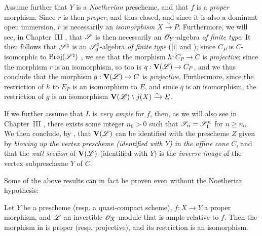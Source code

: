 \begin{remark}[8.8.3]
\label{II.8.8.3}
Assume further that $Y$ is a \emph{Noetherian} prescheme, and that $f$ is a \emph{proper} morphism.
Since $r$ is then \emph{proper}, and thus closed, and since it is also a dominant open immersion, $r$ is necessarily an \emph{isomorphism} $X\xrightarrow{\sim}P$.
Furthermore, we will see, in Chapter~III , that $\mathscr{S}$ is then necessarily an $\mathscr{O}_Y$-algebra \emph{of finite type}.
It then follows that $\mathscr{S}^\natural$ is an $\mathscr{S}_0^\natural$-algebra \emph{of finite type} ([i] and );
since $C_P$ is $C$-isomorphic to $\operatorname{Proj}(\mathscr{S}^\natural)$ , we see that the morphism $h:C_P\to C$ is \emph{projective};
since the morphism $r$ is an isomorphism, so too is $q:\bb{V}(\sh{L})\to C_P$, and we thus conclude that the morphism $g:\bb{V}(\sh{L})\to C$ is \emph{projective}.
Furthermore, since the restriction of $h$ to $E_P$ is an isomorphism to $E$, and since $q$ is an isomorphism, the restriction  of $g$ is an isomorphism $\mathbf{V}(\mathscr{L})\setminus j(X)\xrightarrow{\sim}E$.

If we further assume that $L$ is \emph{very ample} for $f$, then, as we will also see in Chapter~III , there exists some integer $n_0>0$ such that $\mathscr{S}_n=\mathscr{S}_1^n$ for $n\geq n_0$.
We then conclude, by , that $\mathbf{V}(\mathscr{L})$ can be identified with the prescheme $Z$ given by \emph{blowing up the vertex prescheme \emph{(identified with $Y$)} in the affine cone $C$}, and that the \emph{null section} of $\mathbf{V}(\mathscr{L})$ (identified with $Y$) is the \emph{inverse image} of the vertex subprescheme $Y$ of $C$.

Some of the above results can in fact be proven even without the Noetherian hypothesis:
\end{remark}
\begin{corollary}[8.8.4]
\label{II.8.8.4}
Let $Y$ be a prescheme (resp. a quasi-compact scheme), $f:X\to Y$ a proper morphism, and $\mathscr{L}$ an invertible $\mathscr{O}_X$-module that is ample relative to $f$.
Then the morphism in  is proper (resp. projective), and its restriction  is an isomorphism.
\end{corollary}

